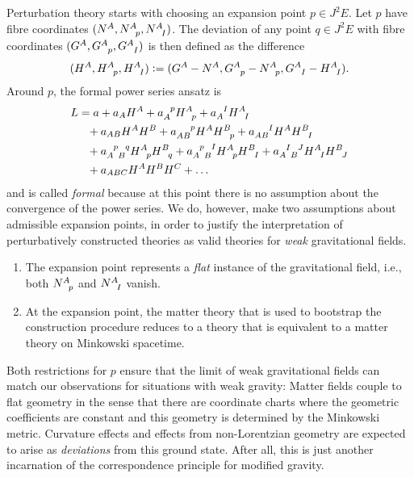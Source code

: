 Perturbation theory starts with choosing an expansion point $p\in J^2E$. Let $p$ have fibre coordinates $(N^A,N^A_{\hphantom Ap},N^A_{\hphantom AI})$. The deviation of any point $q\in J^2E$ with fibre coordinates $(G^A,G^A_{\hphantom Ap},G^A_{\hphantom AI})$ is then defined as the difference
\begin{equation}
  (H^A, H^A_{\hphantom Ap}, H^A_{\hphantom AI}) \vcentcolon= (G^A - N^A, G^A_{\hphantom Ap} - N^A_{\hphantom Ap}, G^A_{\hphantom AI} - H^A_{\hphantom AI}).
\end{equation}
Around $p$, the formal power series ansatz is
\begin{equation}\label{power_series_ansatz}
  \begin{aligned}
    L &{} = a + a_A H^A + a_A^{\hphantom Ap} H^A_{\hphantom Ap} + a_A^{\hphantom AI} H^A_{\hphantom AI} \\
      &{} \hphantom{=} + a_{AB} H^A H^B + a_{AB}^{\hphantom{AB}p} H^A H^B_{\hphantom Bp} + a_{AB}^{\hphantom{AB}I} H^A H^B_{\hphantom BI} \\
      &{} \hphantom{=} + a_{A\hphantom{p}B}^{\hphantom Ap\hphantom{B}q} H^A_{\hphantom Ap} H^B_{\hphantom Bq} + a_{A\hphantom{p}B}^{\hphantom Ap\hphantom{B}I} H^A_{\hphantom Ap} H^B_{\hphantom BI} + a_{A\hphantom{I}B}^{\hphantom AI\hphantom{B}J} H^A_{\hphantom AI} H^B_{\hphantom BJ} \\
      &{} \hphantom{=} + a_{ABC} H^A H^B H^C + \dots
  \end{aligned}
\end{equation}
and is called \emph{formal} because at this point there is no assumption about the convergence of the power series. We do, however, make two assumptions about admissible expansion points, in order to justify the interpretation of perturbatively constructed theories as valid theories for \emph{weak} gravitational fields.
\begin{enumerate}
  \item{The expansion point represents a \emph{flat} instance of the gravitational field, i.e., both $N^A_{\hphantom Ap}$ and $N^A_{\hphantom AI}$ vanish.}
  \item{At the expansion point, the matter theory that is used to bootstrap the construction procedure reduces to a theory that is equivalent to a matter theory on Minkowski spacetime.}
\end{enumerate}
Both restrictions for $p$ ensure that the limit of weak gravitational fields can match our observations for situations with weak gravity: Matter fields couple to flat geometry in the sense that there are coordinate charts where the geometric coefficients are constant and this geometry is determined by the Minkowski metric. Curvature effects and effects from non-Lorentzian geometry are expected to arise as \emph{deviations} from this ground state. After all, this is just another incarnation of the correspondence principle for modified gravity.

